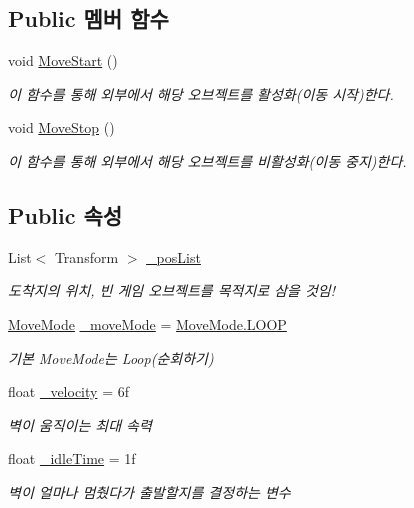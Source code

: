 \subsection*{Public 멤버 함수}
\begin{DoxyCompactItemize}
\item 
void \mbox{\hyperlink{class_moving_platform_a2e7148eddf9ada2373e3507c02146896}{Move\+Start}} ()
\begin{DoxyCompactList}\small\item\em 이 함수를 통해 외부에서 해당 오브젝트를 활성화(이동 시작)한다. \end{DoxyCompactList}\item 
void \mbox{\hyperlink{class_moving_platform_a9150bceccb63034907ab3ec46216ae83}{Move\+Stop}} ()
\begin{DoxyCompactList}\small\item\em 이 함수를 통해 외부에서 해당 오브젝트를 비활성화(이동 중지)한다. \end{DoxyCompactList}\end{DoxyCompactItemize}
\subsection*{Public 속성}
\begin{DoxyCompactItemize}
\item 
List$<$ Transform $>$ \mbox{\hyperlink{class_moving_platform_a51c0ce96c3fc6ad9350dc0350216835b}{\+\_\+pos\+List}}
\begin{DoxyCompactList}\small\item\em 도착지의 위치, 빈 게임 오브젝트를 목적지로 삼을 것임! \end{DoxyCompactList}\item 
\mbox{\hyperlink{class_moving_platform_a7b3427d2906069ecf4c39d69eee53653}{Move\+Mode}} \mbox{\hyperlink{class_moving_platform_a47308284bdf720a8fe919a69f2c0019b}{\+\_\+move\+Mode}} = \mbox{\hyperlink{class_moving_platform_a7b3427d2906069ecf4c39d69eee53653a9159b3578e4e1eb31ffdf90acd6f6e40}{Move\+Mode.\+L\+O\+OP}}
\begin{DoxyCompactList}\small\item\em 기본 Move\+Mode는 Loop(순회하기) \end{DoxyCompactList}\item 
float \mbox{\hyperlink{class_moving_platform_a831cd24df75aa37f0897741d189686a7}{\+\_\+velocity}} = 6f
\begin{DoxyCompactList}\small\item\em 벽이 움직이는 최대 속력 \end{DoxyCompactList}\item 
float \mbox{\hyperlink{class_moving_platform_a293066859b3576c931eb4b8c3f802397}{\+\_\+idle\+Time}} = 1f
\begin{DoxyCompactList}\small\item\em 벽이 얼마나 멈췄다가 출발할지를 결정하는 변수 \end{DoxyCompactList}\end{DoxyCompactItemize}
